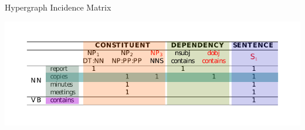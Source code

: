 \documentclass[10pt,xcolor=table]{beamer}
\begin{document}
\begin{frame}{Hypergraph Incidence Matrix}
\begin{center}
\includegraphics[width=1\linewidth]{img/incidence_aug.pdf}
\end{center}

\end{frame} 
\end{document}
